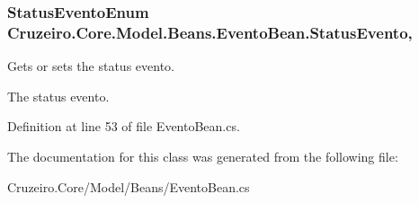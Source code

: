 \subsubsection[{\texorpdfstring{Status\+Evento}{StatusEvento}}]{\setlength{\rightskip}{0pt plus 5cm}Status\+Evento\+Enum Cruzeiro.\+Core.\+Model.\+Beans.\+Evento\+Bean.\+Status\+Evento\hspace{0.3cm}{\ttfamily [get]}, {\ttfamily [set]}}\hypertarget{class_cruzeiro_1_1_core_1_1_model_1_1_beans_1_1_evento_bean_a8c48062d4cb7bf5c51e7063274ca6730}{}\label{class_cruzeiro_1_1_core_1_1_model_1_1_beans_1_1_evento_bean_a8c48062d4cb7bf5c51e7063274ca6730}


Gets or sets the status evento. 

The status evento. 

Definition at line 53 of file Evento\+Bean.\+cs.



The documentation for this class was generated from the following file\+:\begin{DoxyCompactItemize}
\item 
Cruzeiro.\+Core/\+Model/\+Beans/Evento\+Bean.\+cs\end{DoxyCompactItemize}
